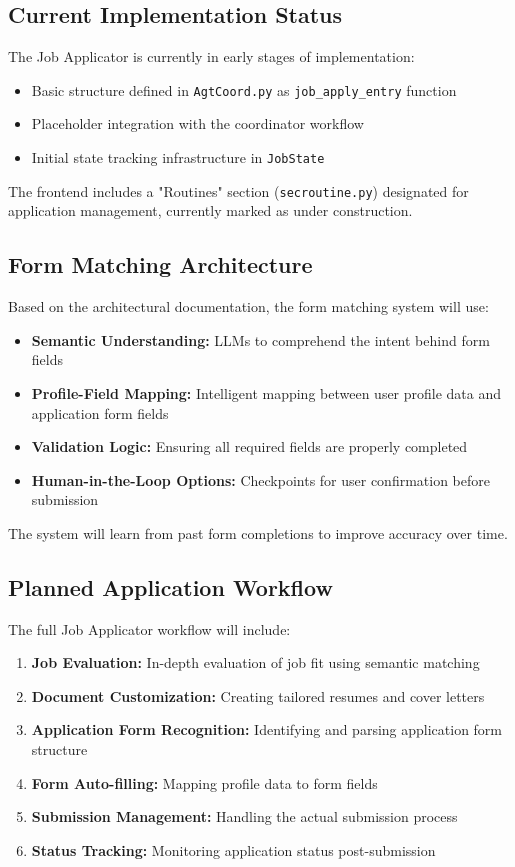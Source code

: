\documentclass[a4paper,12pt]{article}
\begin{document}
\subsection{Current Implementation Status}
The Job Applicator is currently in early stages of implementation:

\begin{itemize}
    \item Basic structure defined in \texttt{AgtCoord.py} as \texttt{job\_apply\_entry} function
    \item Placeholder integration with the coordinator workflow
    \item Initial state tracking infrastructure in \texttt{JobState}
\end{itemize}

The frontend includes a "Routines" section (\texttt{secroutine.py}) designated for application management, currently marked as under construction.

\subsection{Form Matching Architecture}
Based on the architectural documentation, the form matching system will use:

\begin{itemize}
    \item \textbf{Semantic Understanding:} LLMs to comprehend the intent behind form fields
    \item \textbf{Profile-Field Mapping:} Intelligent mapping between user profile data and application form fields
    \item \textbf{Validation Logic:} Ensuring all required fields are properly completed
    \item \textbf{Human-in-the-Loop Options:} Checkpoints for user confirmation before submission
\end{itemize}

The system will learn from past form completions to improve accuracy over time.

\subsection{Planned Application Workflow}
The full Job Applicator workflow will include:

\begin{enumerate}
    \item \textbf{Job Evaluation:} In-depth evaluation of job fit using semantic matching
    \item \textbf{Document Customization:} Creating tailored resumes and cover letters
    \item \textbf{Application Form Recognition:} Identifying and parsing application form structure
    \item \textbf{Form Auto-filling:} Mapping profile data to form fields
    \item \textbf{Submission Management:} Handling the actual submission process
    \item \textbf{Status Tracking:} Monitoring application status post-submission
\end{enumerate}
\end{document}

